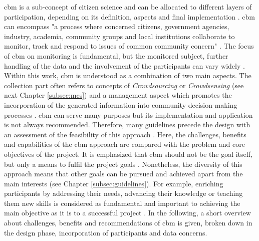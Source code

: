 \acrfull{cbm} is a sub-concept of citizen science and can be allocated to different layers of participation, depending on its definition, aspects and final implementation \autocite{westonCommunityBasedWaterMonitoring2015}. \acrshort{cbm} can encompass "a process where concerned citizens, government agencies, industry, academia, community groups and local institutions collaborate to monitor, track and respond to issues of common community concern" \autocite[410]{whitelawEstablishingCanadianCommunity2003}. The focus of \acrshort*{cbm} on monitoring is fundamental, but the monitored subject, further handling of the data and the involvement of the participants can vary widely \autocite{baptisteCommunityLedMonitoringWhen2020,conradReviewCitizenScience2011,koehlerCitizenParticipationCollaborative2008,muhamadkhairCommunitybasedMonitoringEnvironmental2021,shirkPublicParticipationScientific2012,westonCommunityBasedWaterMonitoring2015}. Within this work, \acrshort*{cbm} is understood as a combination of two main aspects. The collection part often refers to concepts of \textit{Crowdsourcing} or \textit{Crowdsensing} (see next Chapter \ref{subsec:mcs}) and a management aspect which promotes the incorporation of the generated information into community decision-making processes \autocite{conradCommunitybasedMonitoringScience2007, keoughAchievingIntegrativeCollaborative2006}. 
\acrlong*{cbm} can serve many purposes but its implementation and application is not always recommended. Therefore, many guidelines precede the design with an assessment of the feasibility of this approach \autocite{associationTenPrinciplesCitizen2015,citizenscience.govBasicStepsYour,fraislCitizenScienceEnvironmental2022,minkmanCitizenScienceWater2015, pettiboneCitizenScienceAll2016}. Here, the challenges, benefits and capabilities of the \acrshort*{cbm} approach are compared with the problem and core objectives of the project. It is emphasized that \acrshort*{cbm} should not be the goal itself, but only a means to fulfil the project goals \autocite{minkmanCitizenScienceWater2015}. Nonetheless, the diversity of this approach means that other goals can be pursued and achieved apart from the main interests (see Chapter \ref*{subsec:guidelines}). For example, enriching participants by addressing their needs, advancing their knowledge or teaching them new skills is considered as fundamental and important to achieving the main objective as it is to a successful project \autocite{fraislCitizenScienceEnvironmental2022}. 
In the following, a short overview about challenges, benefits and recommendations of \acrshort*{cbm} is given, broken down in the design phase, incorporation of participants and data concerns.

